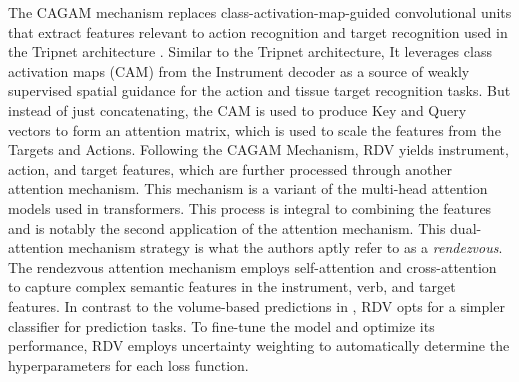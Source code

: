\documentclass[times,twocolumn,final]{elsarticle}
\begin{document}
The CAGAM mechanism replaces class-activation-map-guided convolutional units that extract features relevant to action recognition and target recognition used in the Tripnet architecture \citep{1nywoye_rec_action_triplets}. Similar to the Tripnet architecture, It leverages class activation maps (CAM) from the Instrument decoder as a source of weakly supervised spatial guidance for the action and tissue target recognition tasks. But instead of just concatenating, the CAM is used to produce Key and Query vectors to form an attention matrix, which is used to scale the features from the Targets and Actions. 
Following the CAGAM Mechanism, RDV yields instrument, action, and target features, which are further processed through another attention mechanism. This mechanism is a variant of the multi-head attention models used in transformers. This process is integral to combining the features and is notably the second application of the attention mechanism. This dual-attention mechanism strategy is what the authors aptly refer to as a \emph{rendezvous}. The rendezvous attention mechanism employs self-attention and cross-attention to capture complex semantic features in the instrument, verb, and target features.
In contrast to the volume-based predictions in \citet{1nywoye_rec_action_triplets}, RDV opts for a simpler classifier for prediction tasks. To fine-tune the model and optimize its performance, RDV employs uncertainty weighting \citep{uncertainty_weighting} to automatically determine the hyperparameters for each loss function. 

 

\begin{table}[htb!]
\caption{Results of methods on the CholecT45 dataset. Results should be compared with caution as each reported work sometimes reported a different training/testing split. The mean of the published results are reported.} \label{triplet_results:table}
\end{table}
 
\end{document}
